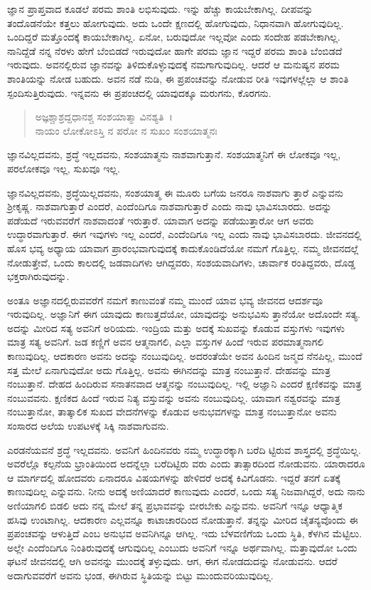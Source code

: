 ಜ್ಞಾನ ಪ್ರಾಪ್ತವಾದ ಕೂಡಲೆ ಪರಮ ಶಾಂತಿ ಲಭಿಸುವುದು. ಇನ್ನು ಹೆಚ್ಚು ಕಾಯಬೇಕಾಗಿಲ್ಲ. ದೀಪವನ್ನು ತಂದೊಡನೆಯೇ ಕತ್ತಲು ಹೋಗುವುದು. ಅದು ಒಂದೇ ಕ್ಷಣದಲ್ಲಿ ಹೋಗುವುದು, ನಿಧಾನವಾಗಿ ಹೋಗುವುದಿಲ್ಲ. ಒಂದಿದ್ದರೆ ಮತ್ತೊಂದಕ್ಕೆ ಕಾಯಬೇಕಾಗಿಲ್ಲ. ಏನೋ, ಬರುವುದೋ ಇಲ್ಲವೋ ಎಂದು ಸಂದೇಹ ಪಡಬೇಕಾಗಿಲ್ಲ. ನಾನಿದ್ದೆಡೆ ನನ್ನ ನೆರಳು ಹೇಗೆ ಬೆಂಬಿಡದೆ ಇರುವುದೋ ಹಾಗೇ ಪರಮ ಜ್ಞಾನ ಇದ್ದರೆ ಪರಮ ಶಾಂತಿ ಬೆಂಬಿಡದೆ ಇರುವುದು. ಅವನಲ್ಲಿರುವ ಜ್ಞಾನವನ್ನು ತಿಳಿದುಕೊಳ್ಳುವುದಕ್ಕೆ ನಮಗಾಗುವುದಿಲ್ಲ. ಆದರೆ ಆ ಮನುಷ್ಯನ ಪರಮ ಶಾಂತಿಯನ್ನು ನೋಡ ಬಹುದು. ಅವನ ನಡೆ ನುಡಿ, ಈ ಪ್ರಪಂಚವನ್ನು ನೋಡುವ ರೀತಿ ಇವುಗಳಲ್ಲೆಲ್ಲಾ ಆ ಶಾಂತಿ ಸ್ಪಂದಿಸುತ್ತಿರುವುದು. ಇನ್ನವನು ಈ ಪ್ರಪಂಚದಲ್ಲಿ ಯಾವುದಕ್ಕೂ ಮರುಗನು, ಕೊರಗನು.

\begin{verse}
ಅಜ್ಞಶ್ಚಾಶ್ರದ್ದಧಾನಶ್ಚ ಸಂಶಯಾತ್ಮಾ ವಿನಶ್ಯತಿ~।\\ನಾಯಂ ಲೋಕೋಽಸ್ತಿ ನ ಪರೋ ನ ಸುಖಂ ಸಂಶಯಾತ್ಮನಃ 
\end{verse}

{\small ಜ್ಞಾನವಿಲ್ಲದವನು, ಶ್ರದ್ಧೆ ಇಲ್ಲದವನು, ಸಂಶಯಾತ್ಮನು ನಾಶವಾಗುತ್ತಾನೆ. ಸಂಶಯಾತ್ಮನಿಗೆ ಈ ಲೋಕವೂ ಇಲ್ಲ, ಪರಲೋಕವೂ ಇಲ್ಲ, ಸುಖವೂ ಇಲ್ಲ.}

ಜ್ಞಾನವಿಲ್ಲದವನು, ಶ್ರದ್ಧೆಯಿಲ್ಲದವನು, ಸಂಶಯಾತ್ಮ ಈ ಮೂರು ಬಗೆಯ ಜನರೂ ನಾಶವಾಗು ತ್ತಾರೆ ಎನ್ನುವನು ಶ‍್ರೀಕೃಷ್ಣ. ನಾಶವಾಗುತ್ತಾರೆ ಎಂದರೆ, ಎಂದೆಂದಿಗೂ ನಾಶವಾಗುತ್ತಾರೆ ಎಂದು ನಾವು ಭಾವಿಸಬಾರದು. ಅದನ್ನು ಪಡೆಯದೆ ಇರುವವರೆಗೆ ನಾಶವಾದಂತೆ ಇರುತ್ತಾರೆ. ಯಾವಾಗ ಅದನ್ನು ಪಡೆಯುತ್ತಾರೋ ಆಗ ಅವರು ಉದ್ಧಾರವಾಗುತ್ತಾರೆ. ಈಗ ಇವುಗಳು ಇಲ್ಲ ಎಂದರೆ, ಎಂದೆಂದಿಗೂ ಇಲ್ಲ ಎಂದು ನಾವು ಭಾವಿಸಬಾರದು. ಜೀವನದಲ್ಲಿ ಹೊಸ ಭವ್ಯ ಅಧ್ಯಾಯ ಯಾವಾಗ ಪ್ರಾರಂಭವಾಗುವುದಕ್ಕೆ ಕಾದುಕೊಂಡಿದೆಯೋ ನಮಗೆ ಗೊತ್ತಿಲ್ಲ. ನಮ್ಮ ಜೀವನದಲ್ಲೆ ನೋಡುತ್ತೇವೆ, ಒಂದು ಕಾಲದಲ್ಲಿ ಜಡವಾದಿಗಳು ಆಗಿದ್ದವರು, ಸಂಶಯವಾದಿಗಳು, ಚಾರ್ವಾಕ ರಂತಿದ್ದವರು, ದೊಡ್ಡ ಭಕ್ತರಾಗಿರುವುದನ್ನು.

ಅಂತೂ ಅಜ್ಞಾನದಲ್ಲಿರುವವರೆಗೆ ನಮಗೆ ಕಾಣುವಂತೆ ನಮ್ಮ ಮುಂದೆ ಯಾವ ಭವ್ಯ ಜೀವನದ ಆದರ್ಶವೂ ಇರುವುದಿಲ್ಲ. ಅಜ್ಞಾನಿಗೆ ಈಗ ಯಾವುದು ಕಾಣುತ್ತದೆಯೋ, ಯಾವುದನ್ನು ಅನುಭವಿಸು ತ್ತಾನೆಯೋ ಅದೊಂದೇ ಸತ್ಯ. ಅದನ್ನು ಮೀರಿದ ಸತ್ಯ ಅವನಿಗೆ ಅರಿಯದು. ಇಂದ್ರಿಯ ಮತ್ತು ಅದಕ್ಕೆ ಸುಖವನ್ನು ಕೊಡುವ ವಸ್ತುಗಳು ಇವುಗಳು ಮಾತ್ರ ಸತ್ಯ ಅವನಿಗೆ. ಜಡ ಕಣ್ಣಿಗೆ ಅವನ ಆತ್ಮನಾಗಲಿ, ಎಲ್ಲಾ ವಸ್ತುಗಳ ಹಿಂದೆ ಇರುವ ಪರಮಾತ್ಮನಾಗಲಿ ಕಾಣುವುದಿಲ್ಲ. ಆದಕಾರಣ ಅವನು ಅದನ್ನು ನಂಬುವುದಿಲ್ಲ. ಅದರಂತೆಯೇ ಅವನ ಹಿಂದಿನ ಜನ್ಮದ ನೆನಪಿಲ್ಲ, ಮುಂದೆ ಸತ್ತ ಮೇಲೆ ಏನಾಗುವುದೋ ಅದು ಗೊತ್ತಿಲ್ಲ. ಅವನು ಈಗಿನದನ್ನು ಮಾತ್ರ ನಂಬುತ್ತಾನೆ. ದೇಹವನ್ನು ಮಾತ್ರ ನಂಬುತ್ತಾನೆ. ದೇಹದ ಹಿಂದಿರುವ ಸನಾತನವಾದ ಆತ್ಮನನ್ನು ನಂಬುವುದಿಲ್ಲ. ಇಲ್ಲಿ ಅಜ್ಞಾನಿ ಎಂದರೆ ಕ್ಷಣಿಕವನ್ನು ಮಾತ್ರ ನಂಬುವವನು. ಕ್ಷಣಿಕದ ಹಿಂದೆ ಇರುವ ನಿತ್ಯ ವಸ್ತುವನ್ನು ಅವನು ನಂಬುವುದಿಲ್ಲ. ಯಾವಾಗ ನಶ್ವರವನ್ನು ಮಾತ್ರ ನಂಬುತ್ತಾನೋ, ತಾತ್ಕಾಲಿಕ ಸುಖದ ವೇದನೆಗಳನ್ನು ಕೊಡುವ ಅನುಭವಗಳನ್ನು ಮಾತ್ರ ನಂಬುತ್ತಾನೋ ಅವನು ಸಂಸಾರದ ಅಲೆಯ ಉಪಟಳಕ್ಕೆ ಸಿಕ್ಕಿ ನಾಶವಾಗುವನು.

ಎರಡನೆಯವನೆ ಶ್ರದ್ಧೆ ಇಲ್ಲದವನು. ಅವನಿಗೆ ಹಿಂದಿನವರು ನಮ್ಮ ಉದ್ಧಾರಕ್ಕಾಗಿ ಬರೆದಿ ಟ್ಟಿರುವ ಶಾಸ್ತ್ರದಲ್ಲಿ ಶ್ರದ್ಧೆಯಿಲ್ಲ. ಅವರೆಲ್ಲೊ ಕಲ್ಪನೆಯ ಭ್ರಾಂತಿಯಿಂದ ಅದನ್ನೆಲ್ಲಾ ಬರೆದಿಟ್ಟಿರು ವರು ಎಂದು ತಾತ್ಸಾರದಿಂದ ನೋಡುವನು. ಯಾರಾದರೂ ಆ ಮಾರ್ಗದಲ್ಲಿ ಹೋದವರು ಏನಾದರೂ ವಿಷಯಗಳನ್ನು ಹೇಳಿದರೆ ಅದಕ್ಕೆ ಕಿವಿಗೊಡನು. ಇದ್ದರೆ ತನಗೆ ಏತಕ್ಕೆ ಕಾಣುವುದಿಲ್ಲ ಎನ್ನುವನು. ನೀನು ಅದಕ್ಕೆ ಅಣಿಯಾದರೆ ಕಾಣುವುದು ಎಂದರೆ, ಒಂದು ಸತ್ಯ ನಿಜವಾಗಿದ್ದರೆ, ಅದು ನಾನು ಅಣಿಯಾಗಲಿ ಬಿಡಲಿ ಅದು ನನ್ನ ಮೇಲೆ ತನ್ನ ಪ್ರಭಾವವನ್ನು ಬೀರಬೇಕು ಎನ್ನುವನು. ಅವನಿಗೆ ಇನ್ನೂ ಆಧ್ಯಾತ್ಮಿಕ ಹಸಿವು ಉಂಟಾಗಿಲ್ಲ. ಆದಕಾರಣ ಎಲ್ಲವನ್ನೂ ಕಾಟಾಚಾರದಿಂದ ನೋಡುತ್ತಾನೆ. ತನ್ನನ್ನು ಮೀರಿದ ಚೈತನ್ಯವೊಂದು ಈ ಪ್ರಪಂಚವನ್ನು ಆಳುತ್ತಿದೆ ಎಂಬ ಅನುಭವ ಅವನಿಗಿನ್ನೂ ಆಗಿಲ್ಲ. ಇದು ಬೆಳವಣಿಗೆಯ ಒಂದು ಸ್ಥಿತಿ, ಕೆಳಗಿನ ಮೆಟ್ಟಿಲು. ಅಲ್ಲೇ ಎಂದೆಂದಿಗೂ ನಿಂತಿರುವುದಕ್ಕೆ ಆಗುವುದಿಲ್ಲ ಎಂಬುದು ಅವನಿಗೆ ಇನ್ನೂ ಅರ್ಥವಾಗಿಲ್ಲ. ಮತ್ತಾವುದೋ ಒಂದು ಘಟನೆ ಜೀವನದಲ್ಲಿ ಆಗಿ ಅವನನ್ನು ಮುಂದಕ್ಕೆ ತಳ್ಳುವುದು. ಆಗ, ಈಗ ನೋಡದುದನ್ನು ನೋಡುವನು. ಆದರೆ ಅದಾಗುವವರೆಗೆ ಅವನು ಭಂಡ, ಈಗಿರುವ ಸ್ಥಿತಿಯನ್ನು ಬಿಟ್ಟು ಮುಂದುವರಿಯುವುದಿಲ್ಲ.

